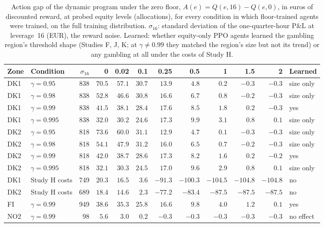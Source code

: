 \begin{table}[!htbp]
\centering
\caption{Action gap of the dynamic program under the zero floor, $A(e) = Q(e, 16) - Q(e, 0)$, in euros of discounted reward, at probed equity levels (allocations), for every condition in which floor-trained agents were trained, on the full training distribution. $\sigma_{16}$: standard deviation of the one-quarter-hour P\&L at leverage~16 (EUR), the reward noise. Learned: whether equity-only PPO agents learned the gambling region's threshold shape (Studies F, J, K; at $\gamma \ne 0.99$ they matched the region's size but not its trend) or any gambling at all under the costs of Study H.}
\label{tab:actiongap}
\scriptsize
\setlength{\tabcolsep}{2.5pt}
\begin{tabular}{@{}llrrrrrrrrrl@{}}
\toprule
Zone & Condition & $\sigma_{16}$ & 0 & 0.02 & 0.1 & 0.25 & 0.5 & 1 & 1.5 & 2 & Learned \\
\midrule
DK1 & $\gamma = 0.95$ & 838 & $70.5$ & $57.1$ & $30.7$ & $13.9$ & $4.8$ & $0.2$ & $-0.3$ & $-0.3$ & size only \\
DK1 & $\gamma = 0.98$ & 838 & $52.8$ & $46.6$ & $30.8$ & $16.6$ & $6.7$ & $0.8$ & $-0.2$ & $-0.3$ & size only \\
DK1 & $\gamma = 0.99$ & 838 & $41.5$ & $38.1$ & $28.4$ & $17.6$ & $8.5$ & $1.8$ & $0.2$ & $-0.3$ & yes \\
DK1 & $\gamma = 0.995$ & 838 & $32.0$ & $30.2$ & $24.6$ & $17.3$ & $9.9$ & $3.1$ & $0.8$ & $0.1$ & size only \\
DK2 & $\gamma = 0.95$ & 818 & $73.6$ & $60.0$ & $31.1$ & $12.9$ & $4.7$ & $0.1$ & $-0.3$ & $-0.3$ & size only \\
DK2 & $\gamma = 0.98$ & 818 & $54.1$ & $47.9$ & $31.2$ & $16.0$ & $6.5$ & $0.7$ & $-0.2$ & $-0.3$ & size only \\
DK2 & $\gamma = 0.99$ & 818 & $42.0$ & $38.7$ & $28.6$ & $17.3$ & $8.2$ & $1.6$ & $0.2$ & $-0.2$ & yes \\
DK2 & $\gamma = 0.995$ & 818 & $32.1$ & $30.3$ & $24.5$ & $17.0$ & $9.6$ & $2.9$ & $0.8$ & $0.1$ & size only \\
DK1 & Study H costs & 749 & $20.3$ & $16.5$ & $3.6$ & $-91.3$ & $-100.3$ & $-104.5$ & $-104.8$ & $-104.8$ & no \\
DK2 & Study H costs & 689 & $18.4$ & $14.6$ & $2.3$ & $-77.2$ & $-83.4$ & $-87.5$ & $-87.5$ & $-87.5$ & no \\
FI & $\gamma = 0.99$ & 949 & $38.6$ & $35.3$ & $25.8$ & $16.6$ & $9.8$ & $4.0$ & $1.2$ & $0.1$ & yes \\
NO2 & $\gamma = 0.99$ & 98 & $5.6$ & $3.0$ & $0.2$ & $-0.3$ & $-0.3$ & $-0.3$ & $-0.3$ & $-0.3$ & no effect \\
\bottomrule
\end{tabular}
\end{table}

